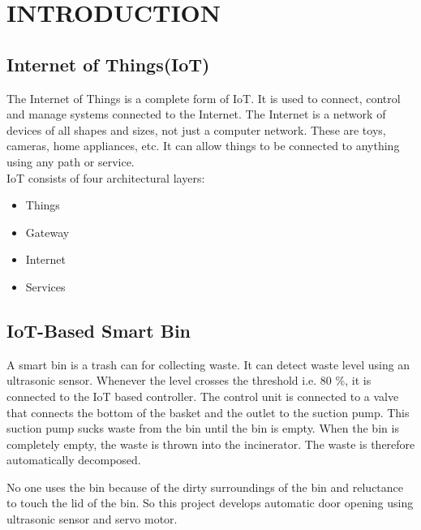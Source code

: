 \chapter{INTRODUCTION}
\thispagestyle{empty}
\onehalfspacing
\pagestyle{fancy}
\fancyhf{}
\fancyhead[LE,RO]{\textit{\footnotesize \thepage}}
 
\renewcommand{\headrulewidth}{2pt}
\renewcommand{\footrulewidth}{1pt}
\section{Internet of Things(IoT)}
The Internet of Things is a complete form of IoT. It is used to connect, control and manage systems connected to the Internet. The Internet is a network of devices of all shapes and sizes, not just a computer network. These are toys, cameras, home appliances, etc. It can allow things to be connected to anything using any path or service.\\
IoT consists of four architectural layers:
\begin{itemize}
    \item Things
    \item Gateway
    \item Internet
    \item Services
\end{itemize}

\section{IoT-Based Smart Bin}
A smart bin is a trash can for collecting waste. It can detect waste level using an ultrasonic sensor. Whenever the level crosses the threshold i.e. 80 \%, it is connected to the IoT based controller. The control unit is connected to a valve that connects the bottom of the basket and the outlet to the suction pump. This suction pump sucks waste from the bin until the bin is empty. When the bin is completely empty, the waste is thrown into the incinerator. The waste is therefore automatically decomposed.
\par No one uses the bin because of the dirty surroundings of the bin and reluctance to touch the lid of the bin. So this project develops automatic door opening using ultrasonic sensor and servo motor.

